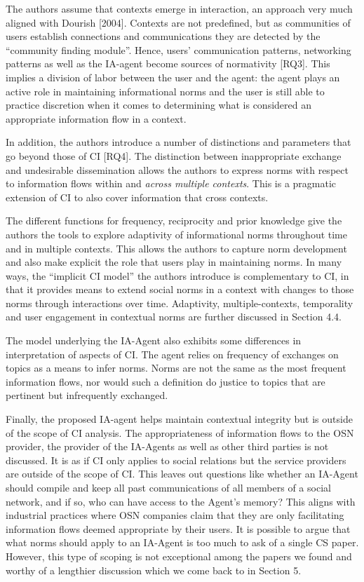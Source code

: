 \documentclass[../thesis.tex]{subfiles}
\begin{document}
The authors assume that contexts emerge in interaction, an approach very
much aligned with Dourish [2004]. Contexts are not predefined, but as
communities of users establish connections and communications they are
detected by the ``community finding
module''. Hence, users' communication
patterns, networking patterns as well as the IA-agent become sources of
normativity [RQ3]. This implies a division of labor between the user
and the agent: the agent plays an active role in maintaining
informational norms and the user is still able to practice discretion
when it comes to determining what is considered an appropriate
information flow in a context.

In addition, the authors introduce a number of distinctions and
parameters that go beyond those of CI [RQ4]. The distinction between
inappropriate exchange and undesirable dissemination allows the authors
to express norms with respect to information flows within and
\textit{across multiple contexts}. This is a pragmatic extension of CI
to also cover information that cross contexts. 

The different functions for frequency, reciprocity and prior knowledge
give the authors the tools to explore adaptivity of informational norms
throughout time and in multiple contexts. This allows the authors to
capture norm development and also make explicit the role that users
play in maintaining norms. In many ways, the
``implicit CI model'' the authors
introduce is complementary to CI, in that it provides means to extend
social norms in a context with changes to those norms through
interactions over time. Adaptivity, multiple-contexts, temporality and
user engagement in contextual norms are further discussed in Section
4.4.

The model underlying the IA-Agent also exhibits some differences in
interpretation of aspects of CI. The agent relies on frequency of
exchanges on topics as a means to infer norms. Norms are not the same
as the most frequent information flows, nor would such a definition do
justice to topics that are pertinent but infrequently exchanged. 

Finally, the proposed IA-agent helps maintain contextual integrity but
is outside of the scope of CI analysis. The appropriateness of
information flows to the OSN provider, the provider of the IA-Agents as
well as other third parties is not discussed. It is as if CI only
applies to social relations but the service providers are outside of
the scope of CI. This leaves out questions like whether an IA-Agent
should compile and keep all past communications of all members of a
social network, and if so, who can have access to the
Agent's memory? This aligns with industrial practices
where OSN companies claim that they are only facilitating information
flows deemed appropriate by their users. It is possible to argue that
what norms should apply to an IA-Agent is too much to ask of a single
CS paper. However, this type of scoping is not exceptional among the
papers we found and worthy of a lengthier discussion which we come back
to in Section 5.
\end{document}
